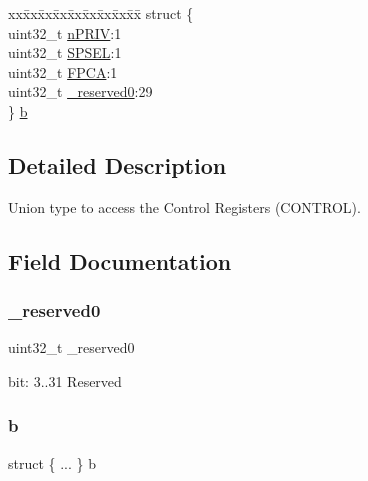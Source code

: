 \begin{DoxyCompactItemize}
\begin{tabbing}
\end{tabbing}\item 
\begin{tabbing}
xx\=xx\=xx\=xx\=xx\=xx\=xx\=xx\=xx\=\kill
struct \{\\
\>uint32\_t \mbox{\hyperlink{union_c_o_n_t_r_o_l___type_a2a6e513e8a6bf4e58db169e312172332}{nPRIV}}:1\\
\>uint32\_t \mbox{\hyperlink{union_c_o_n_t_r_o_l___type_ae185aac93686ffc78e998a9daf41415b}{SPSEL}}:1\\
\>uint32\_t \mbox{\hyperlink{union_c_o_n_t_r_o_l___type_a2518558c090f60161ba4e718a54ee468}{FPCA}}:1\\
\>uint32\_t \mbox{\hyperlink{union_c_o_n_t_r_o_l___type_ac8a6a13838a897c8d0b8bc991bbaf7c1}{\_reserved0}}:29\\
\} \mbox{\hyperlink{union_c_o_n_t_r_o_l___type_abc5bd834a4b1a50b31cfe1a8113f9f68}{b}}\\

\end{tabbing}\end{DoxyCompactItemize}


\subsection{Detailed Description}
Union type to access the Control Registers (C\+O\+N\+T\+R\+OL). 

\subsection{Field Documentation}
\mbox{\label{union_c_o_n_t_r_o_l___type_ac8a6a13838a897c8d0b8bc991bbaf7c1}} 
\subsubsection{\texorpdfstring{\_reserved0}{\_reserved0}}
{\footnotesize\ttfamily uint32\+\_\+t \+\_\+reserved0}

bit\+: 3..31 Reserved \mbox{\label{union_c_o_n_t_r_o_l___type_ab2a41711c248a319c2e7d0ab73c3a8b9}} 
\subsubsection{\texorpdfstring{b}{b}\hspace{0.1cm}{\footnotesize\ttfamily [1/6]}}
{\footnotesize\ttfamily struct \{ ... \}   b}

